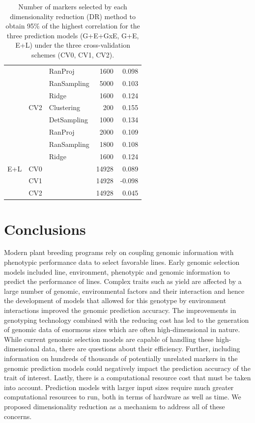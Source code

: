 \begin{center}
\begin{table}[]
\begin{tabular}{@{}lllrr@{}}
           &     & RanProj     & 1600    & 0.098       \\
           &     & RanSampling & 5000   & 0.103       \\
           &     & Ridge       & 1600    & 0.124       \\ \cline{2-5}
           & CV2 & Clustering  & 200     & 0.155       \\
           &     & DetSampling & 1000    & 0.134       \\
           &     & RanProj     & 2000   & 0.109       \\
           &     & RanSampling & 1800   & 0.108       \\
           &     & Ridge       & 1600    & 0.124       \\ \cline{1-5}
E+L        & CV0 &             & 14928   & 0.089       \\
           & CV1 &             & 14928   & -0.098      \\
           & CV2 &             & 14928   & 0.045       \\ \bottomrule
\end{tabular}
\caption{Number of markers selected by each dimensionality reduction (DR) method to obtain 95\% of the highest correlation for the three prediction models (G+E+GxE, G+E, E+L) under the three cross-validation schemes (CV0, CV1, CV2).}
\label{tab:cor_max}
\end{table}
\end{center}


\section{Conclusions}
\label{sec:conclusions}

Modern plant breeding programs rely on coupling genomic information with phenotypic performance data to select favorable lines. Early genomic selection models included line, environment, phenotypic and genomic information to predict the performance of lines. Complex traits such as yield are affected by a large number of genomic, environmental factors and their interaction and hence the development of models that allowed for this genotype by environment interactions improved the genomic prediction accuracy. The improvements in genotyping technology combined with the reducing cost has led to the generation of genomic data of enormous sizes which are often high-dimensional in nature. While current genomic selection models are capable of handling these high-dimensional data, there are questions about their efficiency. Further, including information on hundreds of thousands of potentially unrelated markers in the genomic prediction models could negatively impact the prediction accuracy of the trait of interest. Lastly, there is a computational resource cost that must be taken into account. Prediction models with larger input sizes require much greater computational resources to run, both in terms of hardware as well as time. We proposed dimensionality reduction as a mechanism to address all of these concerns.\\

